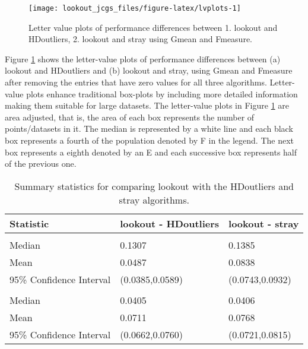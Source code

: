 \documentclass[12pt]{article}
\theoremstyle{definition}
\theoremstyle{definition}
\theoremstyle{definition}
\theoremstyle{definition}
\theoremstyle{remark}
\begin{document}
\begin{figure}
\texttt{[image: lookout\_jcgs\_files/figure-latex/lvplots-1]} \caption{Letter value plots of performance differences between 1. lookout and HDoutliers, 2. lookout and stray using Gmean and Fmeasure.}\label{fig:lvplots}
\end{figure}

Figure \ref{fig:lvplots} shows the letter-value plots \citep{lvplots} of performance differences between
(a) lookout and HDoutliers and
(b) lookout and stray,
using Gmean and Fmeasure after removing the entries that have zero values for all three algorithms. Letter-value plots enhance traditional box-plots by including more detailed information making them suitable for large datasets. The letter-value plots in Figure \ref{fig:lvplots} are area adjusted, that is, the area of each box represents the number of points/datasets in it. The median is represented by a white line and each black box represents a fourth of the population denoted by F in the legend. The next box represents a eighth denoted by an E and each successive box represents half of the previous one.

\begin{table}

\caption{\label{tab:table}Summary statistics for comparing lookout with the HDoutliers and stray algorithms.}
\centering
\begin{tabular}[t]{lll}
\toprule
Statistic & lookout - HDoutliers & lookout - stray\\
\midrule
\addlinespace[0.3em]
\multicolumn{3}{l}{\textbf{Fmeasure}}\\
\hspace{1em}Median & 0.1307 & 0.1385\\
\hspace{1em}Mean & 0.0487 & 0.0838\\
\hspace{1em}95\% Confidence Interval & (0.0385,0.0589) & (0.0743,0.0932)\\
\addlinespace[0.3em]
\multicolumn{3}{l}{\textbf{Gmean}}\\
\hspace{1em}Median & 0.0405 & 0.0406\\
\hspace{1em}Mean & 0.0711 & 0.0768\\
\hspace{1em}95\% Confidence Interval & (0.0662,0.0760) & (0.0721,0.0815)\\
\bottomrule
\end{tabular}
\end{table}
\end{document}

